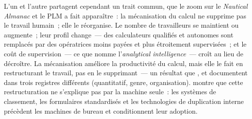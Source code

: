L'un et l'autre partagent cependant un trait commun, que le zoom sur le \emph{Nautical Almanac} et le PLM a fait apparaître~: la mécanisation du calcul ne supprime pas le travail humain~; elle le réorganise. Le nombre de travailleurs se maintient ou augmente~; leur profil change~--- des calculateurs qualifiés et autonomes sont remplacés par des opératrices moins payées et plus étroitement supervisées~; et le coût de supervision~--- ce que \textcite{daston_calculation_2018} nomme l'\emph{analytical intelligence}~--- croît au lieu de décroître. La mécanisation améliore la productivité du calcul, mais elle le fait en restructurant le travail, pas en le supprimant~--- un résultat que \textcite{reinstaller_market_2001}, \textcite{davies_womans_1982} et \textcite{strom_beyond_1992} documentent dans trois registres différents (quantitatif, genre, organisation). \textcite{yates_control_1989} montre que cette restructuration ne s'explique pas par la machine seule~: les systèmes de classement, les formulaires standardisés et les technologies de duplication interne précèdent les machines de bureau et conditionnent leur adoption.

